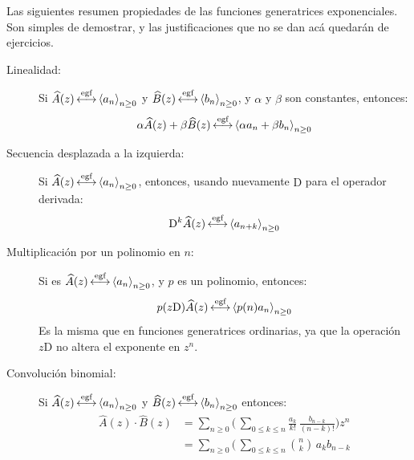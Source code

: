   Las siguientes resumen propiedades
  de las funciones generatrices exponenciales.
  Son simples de demostrar,
  y las justificaciones que no se dan acá quedarán de ejercicios.
  \begin{description}
  \item[Linealidad:]
    Si \(\widehat{A}(z)
           \operatorname{\stackrel{\text{egf}}{\longleftrightarrow}} \left\langle a_n \right\rangle_{n \ge 0}\)
    y \(\widehat{B}(z)
          \operatorname{\stackrel{\text{egf}}{\longleftrightarrow}} \left\langle b_n \right\rangle_{n \ge 0}\),
    y \(\alpha\) y \(\beta\) son constantes,
    entonces:
    \begin{equation*}
      \alpha \widehat{A}(z) + \beta \widehat{B}(z)
        \operatorname{\stackrel{\text{egf}}{\longleftrightarrow}} \left\langle
               \alpha a_n + \beta b_n
             \right\rangle_{n \ge 0}
    \end{equation*}
  \item[Secuencia desplazada a la izquierda:]
    Si \(\widehat{A}(z)
           \operatorname{\stackrel{\text{egf}}{\longleftrightarrow}} \left\langle a_n \right\rangle_{n \ge 0}\),
    entonces,
    usando nuevamente \(\mathrm{D}\) para el operador derivada:
    \begin{equation*}
      \mathrm{D}^k \widehat{A}(z)
        \operatorname{\stackrel{\text{egf}}{\longleftrightarrow}} \left\langle a_{n + k} \right\rangle_{n \ge 0}
    \end{equation*}
  \item[Multiplicación por un polinomio en \(n\):]
    Si es \(\widehat{A}(z)
              \operatorname{\stackrel{\text{egf}}{\longleftrightarrow}} \left\langle a_n \right\rangle_{n \ge 0}\),
    y \(p\) es un polinomio,
    entonces:
    \begin{equation*}
      p(z \mathrm{D}) \widehat{A}(z)
        \operatorname{\stackrel{\text{egf}}{\longleftrightarrow}} \left\langle p(n) a_n \right\rangle_{n \ge 0}
    \end{equation*}
    Es la misma que en funciones generatrices ordinarias,
    ya que la operación \(z \mathrm{D}\)
    no altera el exponente en \(z^n\).
  \item[Convolución binomial:]
    Si \(\widehat{A}(z)
           \operatorname{\stackrel{\text{egf}}{\longleftrightarrow}} \left\langle a_n \right\rangle_{n \ge 0}\) y
    \(\widehat{B}(z)
        \operatorname{\stackrel{\text{egf}}{\longleftrightarrow}} \left\langle b_n \right\rangle_{n \ge 0}\)
    entonces:
    \begin{align*}
      \widehat{A}(z) \cdot \widehat{B}(z)
        &= \sum_{n \ge 0}\biggl( \,
                           \sum_{0 \le k \le n}
                           \frac{a_k}{k!} \, \frac{b_{n - k}}
                                                  {(n - k)!}
                         \biggr) z^n \\
        &= \sum_{n \ge 0} \biggl( \,
                            \sum_{0 \le k \le n}
                               \binom{n}{k} \, a_k b_{n - k}

\end{align*}
\end{description}
